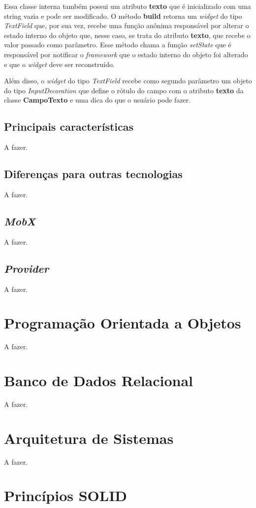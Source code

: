 Essa classe interna também possui um atributo \textbf{texto} que é inicializado com uma string vazia e pode ser modificado. O método \textbf{build} retorna um \textit{widget} do tipo \textit{TextField} que, por sua vez, recebe uma função anônima responsável por alterar o estado interno do objeto que, nesse caso, se trata do atributo \textbf{texto}, que recebe o valor passado como parâmetro. Esse método chama a função \textit{setState} que é responsável por notificar o \textit{framework} que o estado interno do objeto foi alterado e que o \textit{widget} deve ser reconstruído.

Além disso, o \textit{widget} do tipo \textit{TextField} recebe como segundo parâmetro um objeto do tipo \textit{InputDecoration} que define o rótulo do campo com o atributo \textbf{texto} da classe \textbf{CampoTexto} e uma dica do que o usuário pode fazer.

\subsection{Principais características}
A fazer.
\subsection{Diferenças para outras tecnologias}
\label{Subsec:Diferencas_tecnologias}
A fazer.
\subsection{\textit{MobX}}
A fazer.
\subsection{\textit{Provider}}
A fazer.

\section{Programação Orientada a Objetos}
A fazer.

\section{Banco de Dados Relacional}
A fazer.

\section{Arquitetura de Sistemas}
A fazer.

\section{Princípios SOLID}

